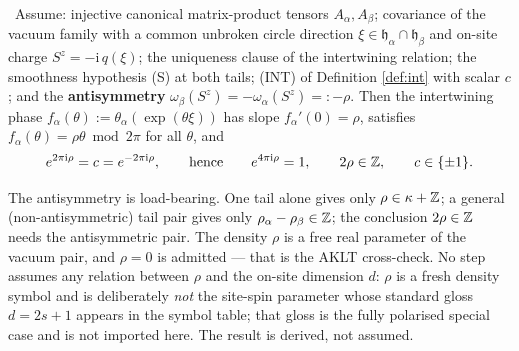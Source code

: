 \begin{theorem}
\label{thm:density}
\statusProved\
Assume: injective canonical matrix-product tensors $A_\alpha,A_\beta$;
covariance of the vacuum family with a common unbroken circle direction
$\xi\in\mathfrak{h}_\alpha\cap\mathfrak{h}_\beta$ and on-site charge
$S^z=-\mathrm{i}\,q(\xi)$; the uniqueness clause of the intertwining relation;
the smoothness hypothesis (S) at both tails; (INT) of Definition \ref{def:int}
with scalar $c$; and the \textbf{antisymmetry}
$\omega_\beta(S^z)=-\omega_\alpha(S^z)=:-\rho$. Then the intertwining phase
$f_\alpha(\theta):=\theta_\alpha(\exp(\theta\xi))$ has slope
$f_\alpha'(0)=\rho$, satisfies $f_\alpha(\theta)=\rho\theta \bmod 2\pi$ for all
$\theta$, and
\begin{equation}
  e^{2\pi\mathrm{i}\rho}=c=e^{-2\pi\mathrm{i}\rho},
  \qquad\text{hence}\qquad e^{4\pi\mathrm{i}\rho}=1,
  \qquad 2\rho\in\mathbb{Z},\qquad c\in\{\pm1\}.
  \label{eq:density-quantization}
\end{equation}
\end{theorem}

\begin{scope}
The antisymmetry is load-bearing. One tail alone gives only
$\rho\in\kappa+\mathbb{Z}$; a general (non-antisymmetric) tail pair gives only
$\rho_\alpha-\rho_\beta\in\mathbb{Z}$; the conclusion $2\rho\in\mathbb{Z}$ needs the
antisymmetric pair. The density $\rho$ is a free real parameter of the vacuum
pair, and $\rho=0$ is admitted --- that is the AKLT cross-check. No step
assumes any relation between $\rho$ and the on-site dimension $d$: $\rho$ is a
fresh density symbol and is deliberately \emph{not} the site-spin parameter
whose standard gloss $d=2s+1$ appears in the symbol table; that gloss is the
fully polarised special case and is not imported here. The result is derived,
not assumed.
\end{scope}


